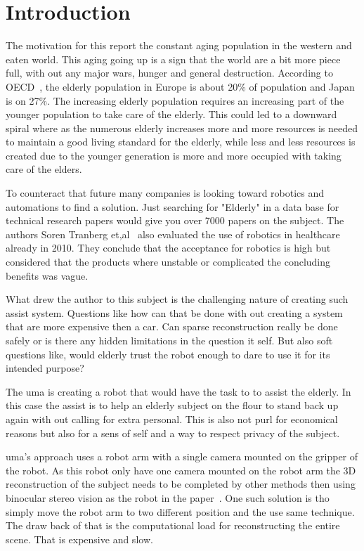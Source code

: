 \section{Introduction}%
\label{sec:intro}
The motivation for this report the constant aging population in the western and eaten world.
This aging going up is a sign that the world are a bit more piece full, with out any major wars, hunger and general destruction.
According to OECD~\cite{oecd2018oecd}, the elderly population in Europe is about 20\% of population and Japan is on 27\%.
The increasing elderly population requires an increasing part of the younger population to take care of the elderly.
This could led to a downward spiral where as the numerous elderly increases more and more resources is needed to maintain a good living standard for the elderly, while less and less resources is created due to the younger generation is more and more occupied with taking care of the elders.

To counteract that future many companies is looking toward robotics and automations to find a solution.
Just searching for "Elderly" in a data base for technical research papers would give you over 7000 papers on the subject.
The authors Soren Tranberg et,al~\cite{Hansen2010evalrobot} also evaluated the use of robotics in healthcare already in 2010.
They conclude that the acceptance for robotics is high but considered that the products where unstable or complicated the concluding benefits was vague.

What drew the author to this subject is the challenging nature of creating such assist system.
Questions like how can that be done with out creating a system that are more expensive then a car.
Can sparse reconstruction really be done safely or is there any hidden limitations in the question it self.
But also soft questions like, would elderly trust the robot enough to dare to use it for its intended purpose?

The \ac{uma} is creating a robot that would have the task to to assist the elderly.
In this case the assist is to help an elderly subject on the flour to stand back up again with out calling for extra personal.
This is also not purl for economical reasons but also for a sens of self and a way to respect privacy of the subject.

\ac{uma}'s approach uses a robot arm with a single camera mounted on the gripper of the robot.
As this robot only have one camera mounted on the robot arm the 3D reconstruction of the subject needs to be completed by other methods then using binocular stereo vision as the robot in the paper~\cite{borangiu2010robot}.
One such solution is tho simply move the robot arm to two different position and the use same technique.
The draw back of that is the computational load for reconstructing the entire scene.
That is expensive and slow.

